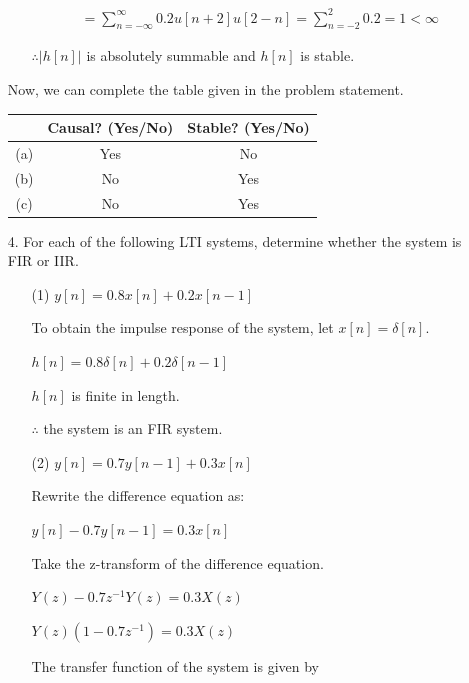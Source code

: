 \documentclass[fleqn]{article}
\begin{document}
\begin{enumerate}[nolistsep]
\begin{enumerate}[nolistsep]
					\begin{align*}
						 = \sum_{n=-\infty}^{\infty}{0.2u[n+2]u[2-n]} = \sum_{n=-2}^{2}{0.2} = 1 < \infty
					\end{align*}
					
					$\therefore |h[n]|$ is absolutely summable and $h[n]$ is stable.
			\end{enumerate}
			
			Now, we can complete the table given in the problem statement.
			
			\begin{center}
				\begin{tabular}{|c|c|c|}
					\hline
					& Causal? (Yes/No) & Stable? (Yes/No) \\
					\hline
					(a) & Yes & No \\
					\hline
					(b) & No & Yes \\
					\hline
					(c) & No & Yes \\
					\hline
				\end{tabular}
			\end{center}
			
		\item[4.] For each of the following LTI systems, determine whether the system is FIR or IIR.
		
			\begin{enumerate}[nolistsep]
			
				\item[(1)] $y[n] = 0.8x[n] + 0.2x[n-1]$
				
				To obtain the impulse response of the system, let $x[n] = \delta[n]$.
				
				$h[n] = 0.8\delta[n] + 0.2\delta[n-1]$
				
				$h[n]$ is finite in length.
				
				$\therefore$ the system is an FIR system.
				
				\item[(2)] $y[n] = 0.7y[n-1] + 0.3x[n]$
				
				Rewrite the difference equation as:
				
				$y[n] - 0.7y[n-1] = 0.3x[n]$
				
				Take the z-transform of the difference equation.
				
				$Y(z) - 0.7z^{-1}Y(z) = 0.3X(z)$
				
				$Y(z)(1 - 0.7z^{-1}) = 0.3X(z)$
				
				The transfer function of the system is given by
				

\end{enumerate}
\end{enumerate}
\end{document}
